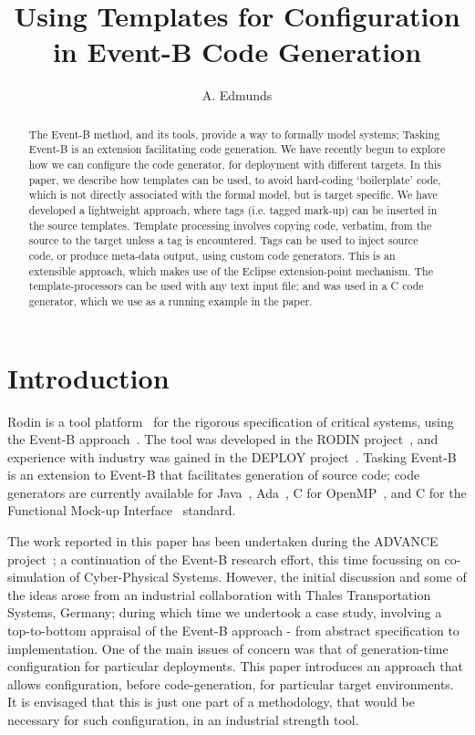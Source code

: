 \documentclass{llncs}%
\begin{document}
%
\title{Using Templates for Configuration\\ in Event-B Code Generation}

\author{A. Edmunds}


\maketitle
%
\begin{abstract}
The Event-B method, and  its tools, provide a way to formally model systems; Tasking Event-B is an extension facilitating code generation.  We have recently begun to explore how we can configure the code generator, for deployment with different targets. In this paper, we describe how templates can be used, to avoid hard-coding `boilerplate' code, which is not directly associated with the formal model, but is target specific. We have developed a lightweight approach, where tags (i.e. tagged mark-up) can be inserted in the source templates. Template processing involves copying code, verbatim, from the source to the target unless a tag is encountered. Tags can be used to inject source code, or produce meta-data output, using custom code generators. This is an extensible approach, which makes use of the Eclipse extension-point mechanism. The template-processors can be used with any text input file; and was used in a C code generator, which we use as a running example in the paper. 
 \end{abstract}
%
%
\section{Introduction}
%
Rodin is a  tool platform~\cite{abrial10rodin} for the rigorous specification of critical systems, using the Event-B approach~\cite{ABR10}. The tool was developed in the RODIN project~\cite{RodinTool}, and experience with industry was gained in the DEPLOY project~\cite{DEPLOY}. Tasking Event-B~\cite{Edmunds2009,Edmunds2008,ae2011a,ae2012b} is an extension to Event-B that facilitates generation of source code; code generators are currently available for Java~\cite{JavaSpec}, Ada~\cite{ada2005}, C for OpenMP~\cite{openmp}, and C for the Functional Mock-up Interface~\cite{FMISTD} standard. 

The work reported in this paper has been undertaken during the ADVANCE project~\cite{advance}; a continuation of the Event-B research effort, this time focussing on co-simulation of Cyber-Physical Systems. However, the initial discussion and some of the ideas arose from an industrial collaboration with Thales Transportation Systems, Germany; during which time we undertook a case study, involving a top-to-bottom appraisal of the Event-B approach - from abstract specification to implementation. One of the main issues of concern was that of generation-time configuration for particular deployments.  This paper introduces an approach that allows configuration, before code-generation, for particular target environments. It is envisaged that this is just one part of a methodology, that would be necessary for such configuration, in an industrial strength tool.   
\end{document}

